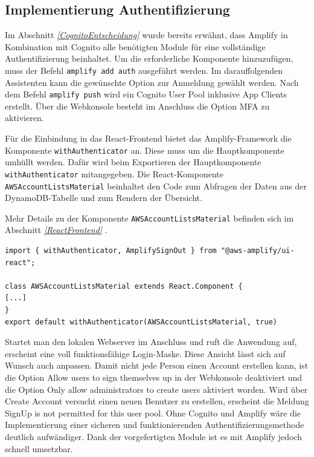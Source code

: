 \subsection{Implementierung Authentifizierung}
\label{ImpAuth}
Im Abschnitt \textit{\ref{CognitoEntscheidung} } wurde bereits erwähnt, dass Amplify in Kombination mit Cognito
alle benötigten Module für eine vollständige Authentifizierung beinhaltet.
Um die erforderliche Komponente hinzuzufügen, muss der Befehl \verb+amplify add auth+ ausgeführt werden.
Im darauffolgenden Assistenten kann die gewünschte Option zur Anmeldung gewählt werden.
Nach dem Befehl \verb+amplify push+ wird ein Cognito User Pool inklusive App Clients erstellt.
Über die Webkonsole besteht im Anschluss die Option MFA zu aktivieren.

Für die Einbindung in das React-Frontend bietet das Amplify-Framework die Komponente \verb+withAuthenticator+ an.
Diese muss um die Hauptkomponente umhüllt werden.
Dafür wird beim Exportieren der Hauptkomponente \verb+withAuthenticator+ mitangegeben. \cite{ImpAuth}
Die React-Komponente \verb+AWSAccountListsMaterial+ beinhaltet den Code zum Abfragen der Daten aus der DynamoDB-Tabelle und zum Rendern der Übersicht.

Mehr Details zu der Komponente \verb+AWSAccountListsMaterial+ befinden sich im Abschnitt \textit{\ref{ReactFrontend} }.
\clearpage
\begin{lstlisting}[basicstyle=\ttfamily\small, breaklines=true , frame = single, backgroundcolor=\color{flashwhite},caption={Auszug aus React-Frontend (Datei: \textit{\nameref{lst:React AccountList}} )} ]
import { withAuthenticator, AmplifySignOut } from "@aws-amplify/ui-react";

class AWSAccountListsMaterial extends React.Component {
[...]
}
export default withAuthenticator(AWSAccountListsMaterial, true)
    \end{lstlisting}


Startet man den lokalen Webserver im Anschluss und ruft die Anwendung auf, erscheint eine voll funktionsfähige Login-Maske.
Diese Ansicht lässt sich auf Wunsch auch anpassen.
Damit nicht jede Person einen Account erstellen kann, ist die Option \glqq Allow users to sign themselves up\grqq{} in der Webkonsole deaktiviert und die Option \glqq Only allow administrators to create users\grqq{} aktiviert worden.
Wird über \glqq Create Account\grqq{} versucht einen neuen Benutzer zu erstellen, erscheint die Meldung \glqq SignUp is not permitted for this user pool\grqq{}.
Ohne Cognito und Amplify wäre die Implementierung einer sicheren und funktionierenden Authentifizierungsmethode deutlich aufwändiger.
Dank der vorgefertigten Module ist es mit Amplify jedoch schnell umsetzbar.

